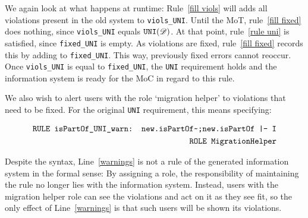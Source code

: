 \documentclass[runningheads]{llncs}
\newcommand{\viol}[2]{{#1}(#2)}
\newcommand{\dataset}{\mathscr{D}}
\begin{document}
   We again look at what happens at runtime:
   Rule~\ref{fill viols} will adds all violations present in the old system to {\tt viols\_UNI}.
   Until the MoT, rule~\ref{fill fixed} does nothing, since {\tt viols\_UNI} equals $\viol{\tt UNI}{\dataset}$.
   At that point, rule~\ref{rule uni} is satisfied, since {\tt fixed\_UNI} is empty.
   As violations are fixed, rule~\ref{fill fixed} records this by adding to {\tt fixed\_UNI}.
   This way, previously fixed errors cannot reoccur.
   Once {\tt viols\_UNI} is equal to {\tt fixed\_UNI}, the \verb=UNI= requirement holds and the information system is ready for the MoC in regard to this rule.
   
   We also wish to alert users with the role `migration helper' to violations that need to be fixed.
   For the original \verb=UNI= requirement, this means specifying:
   
   \begin{align}
   \begin{aligned}
   \text{\tt RULE isPartOf\_UNI\_warn: new.isPartOf\textasciitilde;new.isPartOf |- I}\\
   \quad\text{\tt ROLE MigrationHelper}
   \end{aligned}\label{warnings}
   \end{align}
   
   Despite the syntax, Line~{\ref{warnings}} is not a rule of the generated information system in the formal sense:
   By assigning a role, the responsibility of maintaining the rule no longer lies with the information system.
   Instead, users with the migration helper role can see the violations and act on it as they see fit, so the only effect of Line~{\ref{warnings}} is that such users will be shown its violations.
\end{document}
